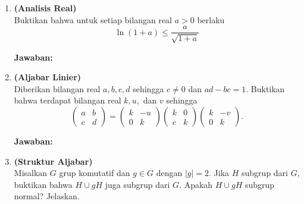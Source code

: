 \documentclass[12pt,a4paper]{article}
\begin{document}
\begin{enumerate}
  \item \textbf{(Analisis Real)}\\
        Buktikan bahwa untuk setiap bilangan real $a>0$ berlaku
        \[ \ln(1+a) \le \frac{a}{\sqrt{1+a}} \]


        \textbf{Jawaban:}
        \par\vspace{0.1cm}\noindent
        \fbox{%
          \begin{minipage}[t][\dimexpr\textheight-\pagetotal-2.5cm\relax]{\dimexpr\linewidth-2\fboxsep-2\fboxrule\relax}
            \mbox{}
          \end{minipage}%
        }

        \newpage

  \item \textbf{(Aljabar Linier)}\\
        Diberikan bilangan real $a, b, c, d$ sehingga $c \ne 0$ dan $ad-bc=1$. Buktikan bahwa terdapat bilangan real $k, u,$ dan $v$ sehingga
        \[
          \begin{pmatrix} a & b \\ c & d \end{pmatrix} =
          \begin{pmatrix} k & -u \\ 0 & k \end{pmatrix}
          \begin{pmatrix} k & 0 \\ c & k \end{pmatrix}
          \begin{pmatrix} k & -v \\ 0 & k \end{pmatrix}.
        \]


        \textbf{Jawaban:}
        \par\vspace{0.1cm}\noindent
        \fbox{%
          \begin{minipage}[t][\dimexpr\textheight-\pagetotal-2.5cm\relax]{\dimexpr\linewidth-2\fboxsep-2\fboxrule\relax}
            \mbox{}
          \end{minipage}%
        }

        \newpage

  \item \textbf{(Struktur Aljabar)}\\
        Misalkan $G$ grup komutatif dan $g \in G$ dengan $|g|=2$. Jika $H$ subgrup dari $G$, buktikan bahwa $H \cup gH$ juga subgrup dari $G$. Apakah $H \cup gH$ subgrup normal? Jelaskan.\\



\end{enumerate}
\end{document}
